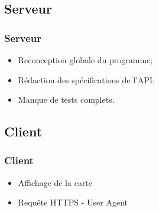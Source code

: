 \subsection{Serveur}
	\begin{frame}
		\frametitle{Serveur}
        \begin{itemize}
            \item Reconception globale du programme; \newline
            \item Rédaction des spécifications de l'API; \newline
            \item Manque de tests complets. \newline
        \end{itemize}
	\end{frame}

\subsection{Client}
	\begin{frame}
		\frametitle{Client}
		\begin{itemize}
			\item Affichage de la carte
			\item Requête HTTPS - User Agent
		\end{itemize}
	\end{frame}
